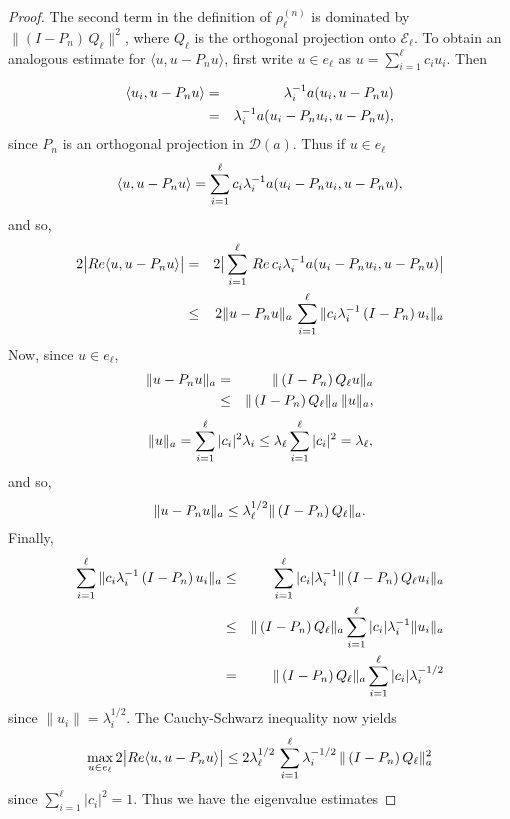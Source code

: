 \documentclass[final]{siamltex}
\numberwithin{equation}{section}
\begin{document}
\begin{proof}
The second term in the definition of $\rho_{\ell}^{(n)}$ is dominated by
$\|\left(I-P_n\right) \, Q_{\ell}\|^2$, where $Q_{\ell}$ is the orthogonal projection onto $\mathcal{E}_{\ell}$. To obtain an analogous estimate for $\langle u , u- P_n u\rangle$, first write $u \in e_{\ell}$ as $u=\sum_{i=1}^{\ell} c_i u_i$. Then

\begin{eqnarray}
\langle u_i, u -P_n u \rangle & = & \lambda_i^{-1} a(u_i, u - P_n u) \notag \\
& = & \lambda_i^{-1} a(u_i - P_n u_i, u - P_n u), \notag
\end{eqnarray}
since $P_n$ is an orthogonal projection in $\mathcal{D}(a)$. Thus if $u \in e_{\ell}$
\begin{equation}
\langle u, u - P_n u \rangle = \sum_{i=1}^{\ell} c_i \lambda_i^{-1} a(u_i - P_n u_i, u - P_n u), \notag
\end{equation}
and so,
\begin{eqnarray}
2 \big| Re \langle u, u - P_n u \rangle \big|&=& 2 \big| \sum_{i=1}^{\ell} \, Re  \, c_i \lambda_i^{-1} a(u_i - P_n u_i, u - P_n u) \big| \notag \\
& \le & 2 \|u - P_n u\|_{a} \, \sum_{i=1}^{\ell} \|c_i \lambda_i^{-1} \left(I-P_n\right) u_i \|_{a} \notag
\end{eqnarray}
Now, since $u \in e_{\ell}$,
\begin{eqnarray}
\|u - P_n u\|_{a} &=& \|\left(I-P_n\right) Q_{\ell} u \|_{a} \notag \\
&\le&  \|\left(I-P_n\right) Q_{\ell}\|_{a} \, \| u \|_{a}, \notag
\end{eqnarray}
\begin{equation}
\| u \|_{a} = \sum_{i=1}^{\ell} |c_i|^2 \lambda_i \le \lambda_{\ell} \sum_{i=1}^{\ell} |c_i|^2 = \lambda_{\ell}, \notag
\end{equation}
and so,
\begin{equation}
\|u- P_n u\|_{a} \le \lambda_{\ell}^{1/2} \|\left(I - P_n\right) Q_{\ell}\|_{a}. \notag
\end{equation}
Finally,
\begin{eqnarray}
\sum_{i=1}^{\ell} \|c_i \lambda_i^{-1} \left(I-P_n\right) u_i\|_{a}
&\le& \sum_{i=1}^{\ell} |c_i| \lambda_i^{-1} \|\left(I-P_n\right)Q_{\ell} u_i\|_{a}
\notag \\
&\le& \|\left(I-P_n\right)Q_{\ell} \|_{a} \sum_{i=1}^{\ell} |c_i| \lambda_i^{-1} \|u_i\|_{a}  \notag \\
& = & \| \left(I-P_n\right)Q_{\ell} \|_{a}  \sum_{i=1}^{\ell} |c_i| \lambda_i^{-1/2} \notag
\end{eqnarray}
since $\|u_i\|=\lambda_i^{1/2}$. The Cauchy-Schwarz inequality now yields
\begin{equation}
\max_{u \in e_{\ell}} 2 \big| Re \langle u, u - P_n u\rangle\big| \le 2 \lambda_{\ell}^{1/2} \, \sum_{i=1}^{\ell} \lambda_i^{-1/2} \, \| \left(I-P_n\right)Q_{\ell} \|_{a}^2 \notag
\end{equation}
since $\sum_{i=1}^{\ell} |c_i|^2=1$. Thus we have the eigenvalue estimates


\end{proof}
\end{document}
